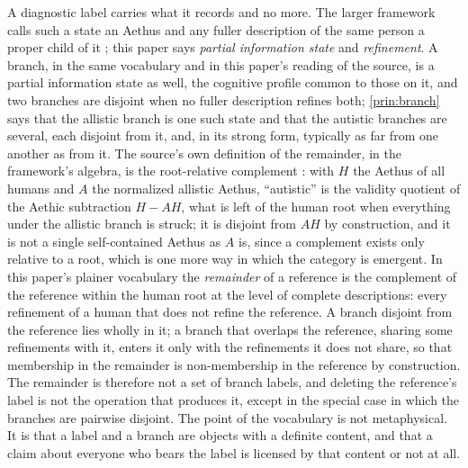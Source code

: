A diagnostic label carries what it records and no more. The larger framework calls such a state an Aethus and any fuller description of the same person a proper child of it \cite{Aethus}; this paper says \emph{partial information state} and \emph{refinement}. A branch, in the same vocabulary and in this paper's reading of the source, is a partial information state as well, the cognitive profile common to those on it, and two branches are disjoint when no fuller description refines both; \autoref{prin:branch} says that the allistic branch is one such state and that the autistic branches are several, each disjoint from it, and, in its strong form, typically as far from one another as from it. The source's own definition of the remainder, in the framework's algebra, is the root-relative complement \cite{Aethus}: with $H$ the Aethus of all humans and $A$ the normalized allistic Aethus, ``autistic'' is the validity quotient of the Aethic subtraction $H - AH$, what is left of the human root when everything under the allistic branch is struck; it is disjoint from $AH$ by construction, and it is not a single self-contained Aethus as $A$ is, since a complement exists only relative to a root, which is one more way in which the category is emergent. In this paper's plainer vocabulary the \emph{remainder} of a reference is the complement of the reference within the human root at the level of complete descriptions: every refinement of a human that does not refine the reference. A branch disjoint from the reference lies wholly in it; a branch that overlaps the reference, sharing some refinements with it, enters it only with the refinements it does not share, so that membership in the remainder is non-membership in the reference by construction. The remainder is therefore not a set of branch labels, and deleting the reference's label is not the operation that produces it, except in the special case in which the branches are pairwise disjoint. The point of the vocabulary is not metaphysical. It is that a label and a branch are objects with a definite content, and that a claim about everyone who bears the label is licensed by that content or not at all.
